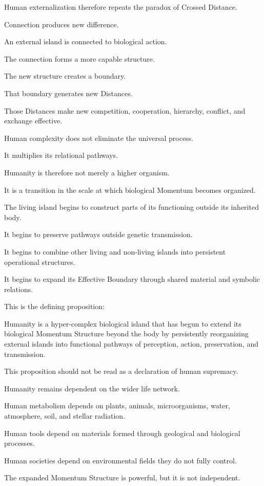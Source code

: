 Human externalization therefore repeats the paradox of Crossed Distance.

Connection produces new difference.

An external island is connected to biological action.

The connection forms a more capable structure.

The new structure creates a boundary.

That boundary generates new Distances.

Those Distances make new competition, cooperation, hierarchy, conflict, and exchange effective.

Human complexity does not eliminate the universal process.

It multiplies its relational pathways.

Humanity is therefore not merely a higher organism.

It is a transition in the scale at which biological Momentum becomes organized.

The living island begins to construct parts of its functioning outside its inherited body.

It begins to preserve pathways outside genetic transmission.

It begins to combine other living and non-living islands into persistent operational structures.

It begins to expand its Effective Boundary through shared material and symbolic relations.

This is the defining proposition:

Humanity is a hyper-complex biological island that has begun to extend its biological Momentum Structure beyond the body by persistently reorganizing external islands into functional pathways of perception, action, preservation, and transmission.

This proposition should not be read as a declaration of human supremacy.

Humanity remains dependent on the wider life network.

Human metabolism depends on plants, animals, microorganisms, water, atmosphere, soil, and stellar radiation.

Human tools depend on materials formed through geological and biological processes.

Human societies depend on environmental fields they do not fully control.

The expanded Momentum Structure is powerful, but it is not independent.


